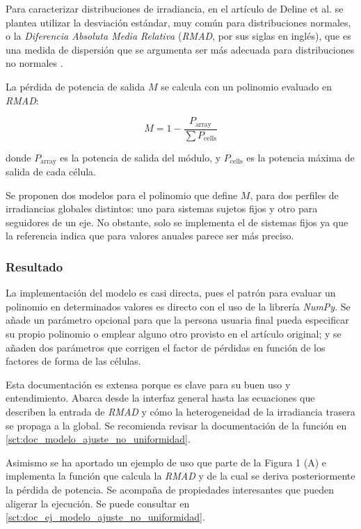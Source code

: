 Para caracterizar distribuciones de irradiancia, en el artículo de Deline et al. \cite{Deline_Ayala_Pelaez_MacAlpine_Olalla_2020} se plantea utilizar la desviación estándar, muy común para distribuciones normales, o la \textit{Diferencia Absoluta Media Relativa} (\textit{RMAD}, por sus siglas en inglés), que es una medida de dispersión que se argumenta ser más adecuada para distribuciones no normales \cite{Ginis_mean_difference_2003}.

La pérdida de potencia de salida $M$ se calcula con un polinomio evaluado en \textit{RMAD}:

\begin{equation} \label{eq:perdidas_heterogeneidad}
    M = 1 - \frac{P_\text{array}}{\sum P_\text{cells}}
\end{equation}

donde $P_\text{array}$ es la potencia de salida del módulo, y $P_\text{cells}$ es la potencia máxima de salida de cada célula.

Se proponen dos modelos para el polinomio que define $M$, para dos perfiles de irradiancias globales distintos: uno para sistemas sujetos fijos y otro para seguidores de un eje. No obstante, solo se implementa el de sistemas fijos ya que la referencia indica que para valores anuales parece ser más preciso.

\subsubsection{Resultado}

La implementación del modelo es casi directa, pues el patrón para evaluar un polinomio en determinados valores es directo con el uso de la librería \textit{NumPy}. Se añade un parámetro opcional para que la persona usuaria final pueda especificar su propio polinomio o emplear alguno otro provisto en el artículo original; y se añaden dos parámetros que corrigen el factor de pérdidas en función de los factores de forma de las células.

Esta documentación es extensa porque es clave para su buen uso y entendimiento. Abarca desde la interfaz general hasta las ecuaciones que describen la entrada de \textit{RMAD} y cómo la heterogeneidad de la irradiancia trasera se propaga a la global. Se recomienda revisar la documentación de la función en \ref{sct:doc_modelo_ajuste_no_uniformidad}.

Asimismo se ha aportado un ejemplo de uso que parte de la Figura 1 (A) e implementa la función que calcula la \textit{RMAD} y de la cual se deriva posteriormente la pérdida de potencia. Se acompaña de propiedades interesantes que pueden aligerar la ejecución. Se puede consultar en \ref{sct:doc_ej_modelo_ajuste_no_uniformidad}.

